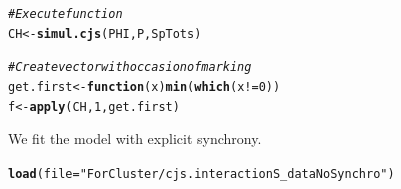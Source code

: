 \documentclass[a4paper, 10pt]{scrartcl}\usepackage[]{graphicx}\usepackage[]{color}
\makeatletter
\newcommand{\hlnum}[1]{\textcolor[rgb]{0.686,0.059,0.569}{#1}}%
\newcommand{\hlstr}[1]{\textcolor[rgb]{0.192,0.494,0.8}{#1}}%
\newcommand{\hlcom}[1]{\textcolor[rgb]{0.678,0.584,0.686}{\textit{#1}}}%
\newcommand{\hlopt}[1]{\textcolor[rgb]{0,0,0}{#1}}%
\newcommand{\hlstd}[1]{\textcolor[rgb]{0.345,0.345,0.345}{#1}}%
\newcommand{\hlkwa}[1]{\textcolor[rgb]{0.161,0.373,0.58}{\textbf{#1}}}%
\newcommand{\hlkwb}[1]{\textcolor[rgb]{0.69,0.353,0.396}{#1}}%
\newcommand{\hlkwc}[1]{\textcolor[rgb]{0.333,0.667,0.333}{#1}}%
\newcommand{\hlkwd}[1]{\textcolor[rgb]{0.737,0.353,0.396}{\textbf{#1}}}%
\newenvironment{kframe}{%
 \def\at@end@of@kframe{}%
 \ifinner\ifhmode%
  \def\at@end@of@kframe{\end{minipage}}%
  \begin{minipage}{\columnwidth}%
 \fi\fi%
 \def\FrameCommand##1{\hskip\@totalleftmargin \hskip-\fboxsep
 \colorbox{shadecolor}{##1}\hskip-\fboxsep
     \hskip-\linewidth \hskip-\@totalleftmargin \hskip\columnwidth}%
 \MakeFramed {\advance\hsize-\width
   \@totalleftmargin\z@ \linewidth\hsize
   \@setminipage}}%
 {\par\unskip\endMakeFramed%
 \at@end@of@kframe}
\newenvironment{knitrout}{}{} %
\makeatother
\begin{document}
\begin{knitrout}
\color{fgcolor}\begin{kframe}
\begin{alltt}
\hlcom{# Execute function}
\hlstd{CH} \hlkwb{<-} \hlkwd{simul.cjs}\hlstd{(PHI, P, SpTots)}

\hlcom{# Create vector with occasion of marking}
\hlstd{get.first} \hlkwb{<-} \hlkwa{function}\hlstd{(}\hlkwc{x}\hlstd{)} \hlkwd{min}\hlstd{(}\hlkwd{which}\hlstd{(x}\hlopt{!=}\hlnum{0}\hlstd{))}
\hlstd{f} \hlkwb{<-} \hlkwd{apply}\hlstd{(CH,} \hlnum{1}\hlstd{, get.first)}
\end{alltt}
\end{kframe}
\end{knitrout}

We fit the model with explicit synchrony.

\begin{knitrout}
\color{fgcolor}\begin{kframe}
\begin{alltt}
\hlkwd{load}\hlstd{(}\hlkwc{file} \hlstd{=} \hlstr{"ForCluster/cjs.interactionS_dataNoSynchro"}\hlstd{)}
\end{alltt}
\end{kframe}
\end{knitrout}
\end{document}
